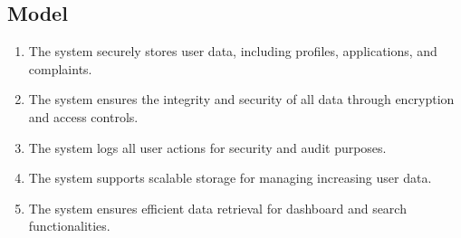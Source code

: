 \subsection{Model}
\label{subsec:model}
\begin{enumerate}[label=R\arabic*:, itemsep=0.2em, start=55]
    \item The system securely stores user data, including profiles, applications, and complaints.
    \item The system ensures the integrity and security of all data through encryption and access controls.
    \item The system logs all user actions for security and audit purposes.
    \item The system supports scalable storage for managing increasing user data.
    \item The system ensures efficient data retrieval for dashboard and search functionalities.
\end{enumerate}
